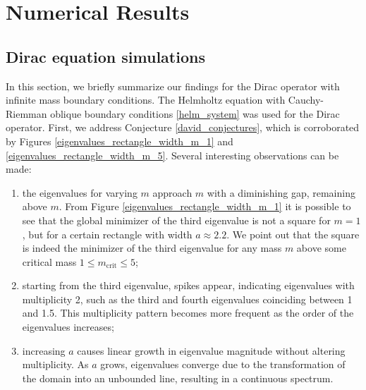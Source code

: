 \documentclass[5p,authoryear]{elsarticle}
\begin{document}
\section{Numerical Results}

\subsection{Dirac equation simulations}

In this section, we briefly summarize our findings for the Dirac operator with infinite mass boundary conditions. The Helmholtz equation with Cauchy-Riemman oblique boundary conditions \eqref{helm_system} was used for the Dirac operator. First, we address Conjecture \ref{david_conjectures}, which is corroborated by Figures \ref{eigenvalues_rectangle_width_m_1} and \ref{eigenvalues_rectangle_width_m_5}. Several
interesting observations can be made:
\begin{enumerate}
    \item \label{dirac_sim_quad_point_1} the eigenvalues for varying \(m\) approach \(m\) with a diminishing gap, remaining above \(m\). From Figure \ref{eigenvalues_rectangle_width_m_1} it is possible to see that the global minimizer of the third eigenvalue is not a square for \(m=1\), but for a certain rectangle with width \(a \approx 2.2\). We point out that the square is indeed the minimizer of the third eigenvalue for any mass \(m\) above some critical mass \(1 \leq m_{\text{crit}} \leq 5\);

    \item \label{dirac_sim_quad_point_2} starting from the third eigenvalue, spikes appear, indicating eigenvalues with multiplicity 2, such as the third and fourth eigenvalues coinciding between 1 and 1.5. This multiplicity pattern becomes more frequent as the order of the eigenvalues increases;

    \item \label{dirac_sim_quad_point_3} increasing \(a\) causes linear growth in eigenvalue magnitude without altering multiplicity. As \(a\) grows, eigenvalues converge due to the transformation of the domain into an unbounded line, resulting in a continuous spectrum.
\end{enumerate}
\end{document}
